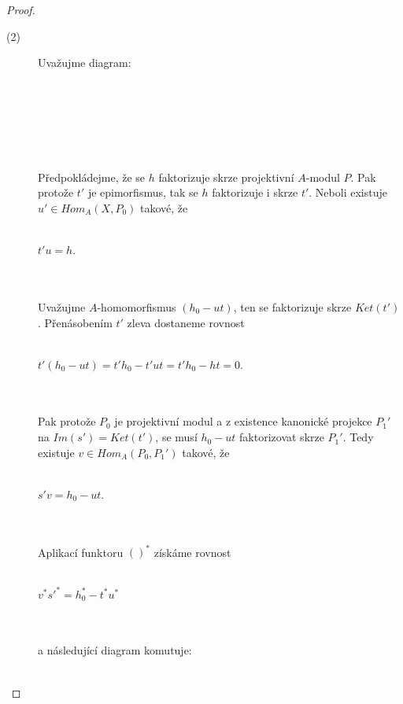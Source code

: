 \begin{proof}
\begin{description}
         \item[(2)] Uvažujme diagram:\\\\
         \centerline{\\}\\\\\\
         Předpokládejme, že se $h$ faktorizuje skrze projektivní $A$-modul $P$. 
         Pak protože $t'$ je epimorfismus, tak se $h$ faktorizuje i skrze $t'$. 
         Neboli existuje $u'\in Hom_A(X,P_0)$ takové, že 
         \\\\\centerline{$t'u=h$.}\\\\
         Uvažujme $A$-homomorfismus $(h_0-ut)$, ten se faktorizuje skrze 
         $Ket(t')$. Přenásobením $t'$ zleva 
         dostaneme rovnost
         \\\\\centerline{$t'(h_0-ut)=t'h_0-t'ut=t'h_0-ht=0$.}\\\\
         Pak protože $P_0$ je projektivní modul a z existence kanonické 
         projekce $P_1'$ na $Im(s')=Ket(t')$, se musí $h_0-ut$ faktorizovat 
         skrze $P_1'$. Tedy existuje $v\in Hom_A(P_0,P_1')$ takové, že
         \\\\\centerline{$s'v=h_0-ut$.}\\\\
         Aplikací funktoru $()^*$ získáme rovnost
         \\\\\centerline{$v^*s'^*=h_0^*-t^*u^*$}\\\\
         a následující diagram komutuje:\\\\
         \centerline{}
\end{description}
\end{proof}
